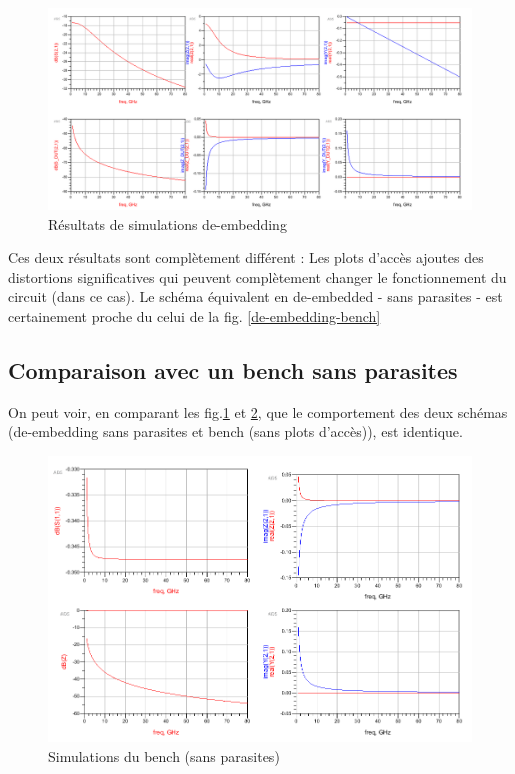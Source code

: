 \documentclass[a4paper]{article}
\begin{document}
\begin{figure}[!htb]
\begin{center}
  \includegraphics[scale=0.40]{de-embedding_whole_sim.png}
  \caption{R\'esultats de simulations de-embedding}
  \label{de-embedding-whole-sim}
\end{center}
\end{figure}

Ces deux r\'esultats sont compl\`etement diff\'erent : Les plots d'acc\`es ajoutes des distortions significatives qui peuvent compl\`etement
changer le fonctionnement du circuit (dans ce cas). Le sch\'ema \'equivalent en de-embedded - sans parasites - est certainement proche du celui
de la fig. \ref{de-embedding-bench}

\clearpage
\subsection{Comparaison avec un bench sans parasites}

On peut voir, en comparant les fig.\ref{de-embedding-whole-sim} et \ref{de-embedding-bench_sim}, que le comportement des deux sch\'emas (de-embedding
sans parasites et bench (sans plots d'acc\`es)), est identique.

\begin{figure}[!htb]
\begin{center}
  \includegraphics[scale=0.40]{de-embedding_bench_sim.png}
  \caption{Simulations du bench (sans parasites)}
  \label{de-embedding-bench_sim}
\end{center}
\end{figure}
\end{document}
